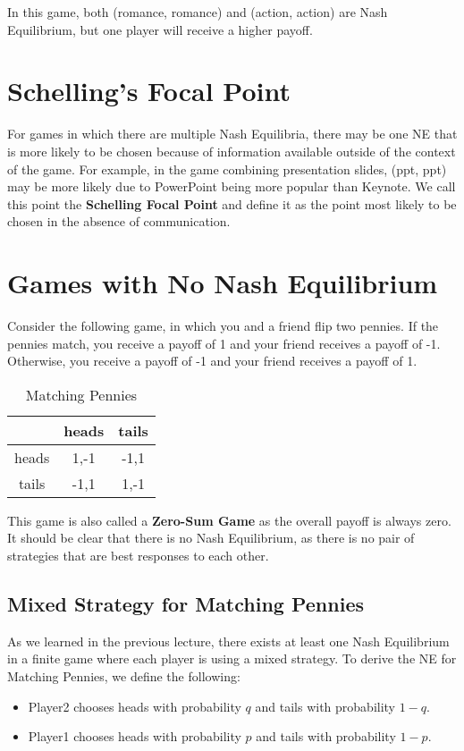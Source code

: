 \documentclass[twoside]{article}
\begin{document}
In this game, both (romance, romance) and (action, action) are Nash Equilibrium, but one player will receive a higher payoff.

\section{Schelling's Focal Point}
For games in which there are multiple Nash Equilibria, there may be one NE that is more likely to be chosen because of information available outside of the context of the game. For example, in the game combining presentation slides, (ppt, ppt) may be more likely due to PowerPoint being more popular than Keynote. We call this point the \textbf{Schelling Focal Point} and define it as the point most likely to be chosen in the absence of communication.

\section{Games with No Nash Equilibrium}
Consider the following game, in which you and a friend flip two pennies. If the pennies match, you receive a payoff of 1 and your friend receives a payoff of -1. Otherwise, you receive a payoff of -1 and your friend receives a payoff of 1.

\begin{table}[h]
    \centering
    \begin{tabular}{|c|c|c|}
        \hline
        & heads & tails \\
        \hline
        heads & 1,-1 & -1,1 \\
        \hline
        tails & -1,1 & 1,-1 \\
        \hline
    \end{tabular}
    \caption{Matching Pennies}
    \label{tab:matchingPennies}
\end{table}

This game is also called a \textbf{Zero-Sum Game} as the overall payoff is always zero. It should be clear that there is no Nash Equilibrium, as there is no pair of strategies that are best responses to each other.

\subsection{Mixed Strategy for Matching Pennies}
As we learned in the previous lecture, there exists at least one Nash Equilibrium in a finite game where each player is using a mixed strategy. To derive the NE for Matching Pennies, we define the following:
\begin{itemize}
    \item Player2 chooses heads with probability $q$ and tails with probability $1-q$.
    \item Player1 chooses heads with probability $p$ and tails with probability $1-p$.
\end{itemize}
\end{document}
